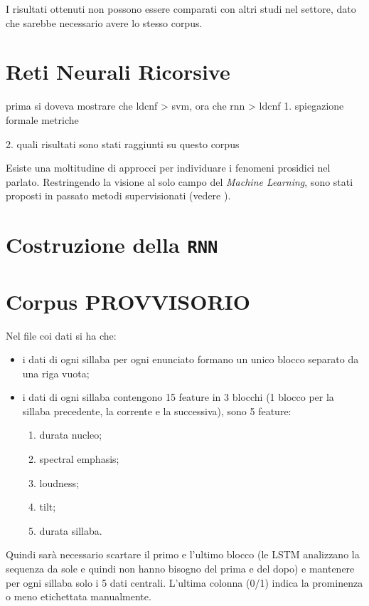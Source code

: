 \documentclass[twoside,twocolumn,11pt]{extarticle}
\theoremstyle{definition}
\begin{document}
		I risultati ottenuti non possono essere comparati con altri studi nel settore, dato che sarebbe necessario avere lo stesso corpus.
	
\section{Reti Neurali Ricorsive}\label{sec:rnn}
prima si doveva mostrare che ldcnf > svm, ora che rnn > ldcnf
	1. spiegazione formale metriche
	
	2. quali risultati sono stati raggiunti su questo corpus
	
	Esiste una moltitudine di approcci per individuare i fenomeni prosidici nel parlato. Restringendo la visione al solo campo del \textit{Machine Learning}, sono stati proposti in passato metodi supervisionati (vedere \cite[Capitolo 4]{bib:fenomeni-prosodici-prominenza}).

\section{Costruzione della \texttt{RNN}}\label{sec:building}

\newpage\null\pagestyle{empty}\newpage
\newpage\null\pagestyle{empty}\newpage
\newpage\null\pagestyle{empty}\newpage

\section{Corpus PROVVISORIO}
	Nel file coi dati si ha che:
	\begin{itemize}
		\item i dati di ogni sillaba per ogni enunciato formano un unico blocco separato da una riga vuota;
		\item i dati di ogni sillaba contengono 15 feature in 3 blocchi (1 blocco per la sillaba precedente, la corrente e la successiva), sono 5 feature:
		\begin{enumerate}
			\item durata nucleo;
			\item spectral emphasis;
			\item loudness;
			\item tilt;
			\item durata sillaba.
		\end{enumerate}
	\end{itemize}
	Quindi sarà necessario scartare il primo e l'ultimo blocco (le LSTM analizzano la 
	sequenza da sole e quindi non hanno bisogno del prima e del dopo) e mantenere per ogni sillaba solo i 5 dati centrali. L'ultima colonna (0/1) indica la prominenza o meno etichettata manualmente.
	
\end{document}
